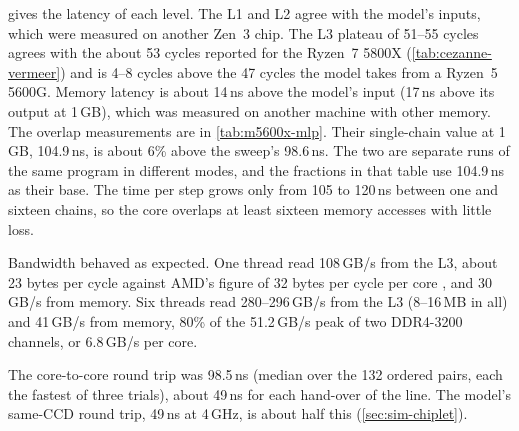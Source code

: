  gives the latency of each level. The L1 and L2 agree with the model's inputs, which were measured on another Zen~3 chip. The L3 plateau of 51--55 cycles agrees with the about 53 cycles reported for the Ryzen~7 5800X (\cref{tab:cezanne-vermeer}) and is 4--8 cycles above the 47 cycles the model takes from a Ryzen~5 5600G. Memory latency is about 14\,ns above the model's input (17\,ns above its output at 1\,GB), which was measured on another machine with other memory. The overlap measurements are in \cref{tab:m5600x-mlp}. Their single-chain value at 1\,GB, 104.9\,ns, is about 6\% above the sweep's 98.6\,ns. The two are separate runs of the same program in different modes, and the fractions in that table use 104.9\,ns as their base. The time per step grows only from 105 to 120\,ns between one and sixteen chains, so the core overlaps at least sixteen memory accesses with little loss.

Bandwidth behaved as expected. One thread read 108\,GB/s from the L3, about 23 bytes per cycle against AMD's figure of 32 bytes per cycle per core \cite[slide~20]{wuu2022vcache}, and 30\,GB/s from memory. Six threads read 280--296\,GB/s from the L3 (8--16\,MB in all) and 41\,GB/s from memory, 80\% of the 51.2\,GB/s peak of two DDR4-3200 channels, or 6.8\,GB/s per core.

The core-to-core round trip was 98.5\,ns (median over the 132 ordered pairs, each the fastest of three trials), about 49\,ns for each hand-over of the line. The model's same-CCD round trip, 49\,ns at 4\,GHz, is about half this (\cref{sec:sim-chiplet}).

